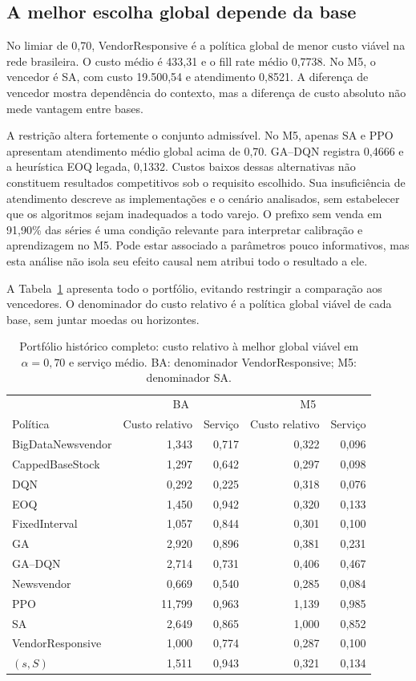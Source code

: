 \documentclass[preprint,12pt]{elsarticle}
\begin{document}
\subsection{A melhor escolha global depende da base}
No limiar de 0,70, VendorResponsive é a política global de menor custo viável na rede brasileira. O custo médio é 433,31 e o fill rate médio 0,7738. No M5, o vencedor é SA, com custo 19.500,54 e atendimento 0,8521. A diferença de vencedor mostra dependência do contexto, mas a diferença de custo absoluto não mede vantagem entre bases.

A restrição altera fortemente o conjunto admissível. No M5, apenas SA e PPO apresentam atendimento médio global acima de 0,70. GA--DQN registra 0,4666 e a heurística EOQ legada, 0,1332. Custos baixos dessas alternativas não constituem resultados competitivos sob o requisito escolhido. Sua insuficiência de atendimento descreve as implementações e o cenário analisados, sem estabelecer que os algoritmos sejam inadequados a todo varejo. O prefixo sem venda em 91,90\% das séries é uma condição relevante para interpretar calibração e aprendizagem no M5. Pode estar associado a parâmetros pouco informativos, mas esta análise não isola seu efeito causal nem atribui todo o resultado a ele.

A Tabela~\ref{tab:portfolio_dual} apresenta todo o portfólio, evitando restringir a comparação aos vencedores. O denominador do custo relativo é a política global viável de cada base, sem juntar moedas ou horizontes.

\begin{table}[htbp]\centering\small
\caption{Portfólio histórico completo: custo relativo à melhor global viável em $\alpha=0{,}70$ e serviço médio. BA: denominador VendorResponsive; M5: denominador SA.}\label{tab:portfolio_dual}
\begin{tabular}{@{}lrrrr@{}}\toprule
 & \multicolumn{2}{c}{BA} & \multicolumn{2}{c}{M5}\\
Política & Custo relativo & Serviço & Custo relativo & Serviço\\\midrule
BigDataNewsvendor & 1,343 & 0,717 & 0,322 & 0,096\\
CappedBaseStock & 1,297 & 0,642 & 0,297 & 0,098\\
DQN & 0,292 & 0,225 & 0,318 & 0,076\\
EOQ & 1,450 & 0,942 & 0,320 & 0,133\\
FixedInterval & 1,057 & 0,844 & 0,301 & 0,100\\
GA & 2,920 & 0,896 & 0,381 & 0,231\\
GA--DQN & 2,714 & 0,731 & 0,406 & 0,467\\
Newsvendor & 0,669 & 0,540 & 0,285 & 0,084\\
PPO & 11,799 & 0,963 & 1,139 & 0,985\\
SA & 2,649 & 0,865 & 1,000 & 0,852\\
VendorResponsive & 1,000 & 0,774 & 0,287 & 0,100\\
$(s,S)$ & 1,511 & 0,943 & 0,321 & 0,134\\
\bottomrule\end{tabular}\end{table}
\end{document}
